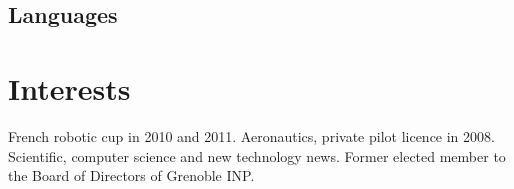 \documentclass[10pt,a4paper]{moderncv}
\begin{document}
	\subsection{Languages}


\section{Interests}
	{French robotic cup in 2010 and 2011.\newline{}\newline{}}
	{Aeronautics, private pilot licence in 2008.}
	\cvline{}
	{Scientific, computer science and new technology news.}
	\cvline{}
	{Former elected member to the Board of Directors of Grenoble INP.}
\end{document}
